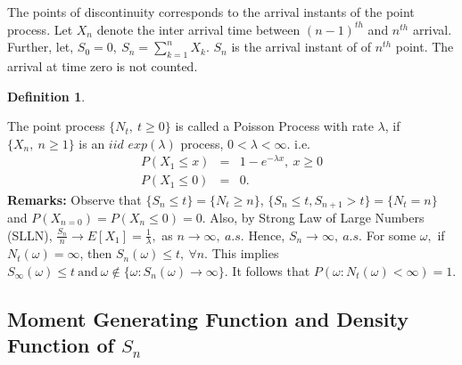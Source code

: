 \documentclass[11 pt]{article}
\theoremstyle{plain}
\theoremstyle{definition}
\newtheorem{defn}{Definition}[section]
\theoremstyle{remark}
\begin{document}
\noindent The points of discontinuity corresponds to the arrival instants of the point process. Let $X_{n}$  denote the inter arrival time between $(n-1)^{th}$ and $n^{th}$ arrival. Further, let, $S_{0}=0,~ S_{n}= \sum^{n}_{k=1}X_{k}$. $S_{n}$ is the arrival instant of of $n^{th}$ point. The arrival at time zero is not counted. \\
\begin{defn}
\end{defn}
The point process $\{N_{t},~ t\geq0\} $ is called a Poisson Process with rate $\lambda$, if $\{X_{n},~n\geq 1\}$ is an $iid$ $exp(\lambda)$ process, $ 0<\lambda<\infty$.  i.e.
 \begin{eqnarray*}
  P(X_{1}\leq x)&=& 1-e^{-\lambda x},~ x\geq 0   \\
  P(X_{1}\leq 0)&=& 0.
\end{eqnarray*}
\textbf{Remarks:} Observe that $\{S_{n}\leq t\} =  \{N_{t}\geq n \}$,  $\{S_{n}\leq t, S_{n+1}> t \} = \{N_{t}= n\}$ and $P(X_{n=0}) = P(X_{n}\leq 0) =0$. Also, by Strong Law of Large Numbers (SLLN), $\frac{S_{n}}{n} \rightarrow E[X_{1}] = \frac{1}{\lambda},$ as $n \rightarrow \infty, ~ a.s$. Hence, $S_n \rightarrow \infty, ~ a.s$. For some $\omega,$ if $ N_{t}(\omega) = \infty$, then $S_{n}(\omega)\leq t, ~  \forall n$. This implies $S_{\infty}(\omega)\leq t ~\text{and}~  \omega \not\in \{\omega: S_{n}(\omega) \rightarrow \infty \}.$ It follows that $P(\omega: N_{t}(\omega) < \infty) =1$. 


\subsection{Moment Generating Function and Density Function of $S_n$}
 
\end{document}
